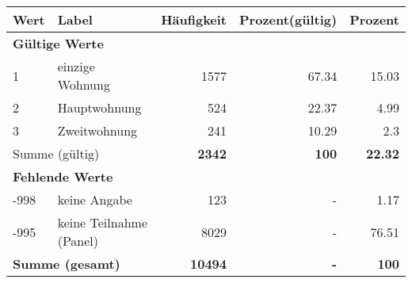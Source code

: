      \begin{longtable}{lXrrr}
     \toprule
     \textbf{Wert} & \textbf{Label} & \textbf{Häufigkeit} & \textbf{Prozent(gültig)} & \textbf{Prozent} \\
     \endhead
     \midrule
     \multicolumn{5}{l}{\textbf{Gültige Werte}}\\

     1 &
     \multicolumn{1}{X}{ einzige Wohnung   } &


       \num{1577} &
       \num[round-mode=places,round-precision=2]{67,34} &
         \num[round-mode=places,round-precision=2]{15,03} \\

     2 &
     \multicolumn{1}{X}{ Hauptwohnung   } &


       \num{524} &
       \num[round-mode=places,round-precision=2]{22,37} &
         \num[round-mode=places,round-precision=2]{4,99} \\

     3 &
     \multicolumn{1}{X}{ Zweitwohnung   } &


       \num{241} &
       \num[round-mode=places,round-precision=2]{10,29} &
         \num[round-mode=places,round-precision=2]{2,3} \\
     \midrule
     \multicolumn{2}{l}{Summe (gültig)} &
       \textbf{\num{2342}} &
     \textbf{100} &
       \textbf{\num[round-mode=places,round-precision=2]{22,32}} \\
     \multicolumn{5}{l}{\textbf{Fehlende Werte}}\\
       -998 &
       keine Angabe &
         \num{123} &
        - &
         \num[round-mode=places,round-precision=2]{1,17} \\
       -995 &
       keine Teilnahme (Panel) &
         \num{8029} &
        - &
         \num[round-mode=places,round-precision=2]{76,51} \\
     \midrule
     \multicolumn{2}{l}{\textbf{Summe (gesamt)}} &
          \textbf{\num{10494}} &
        \textbf{-} &
        \textbf{100} \\
     \bottomrule
     \end{longtable}
     
